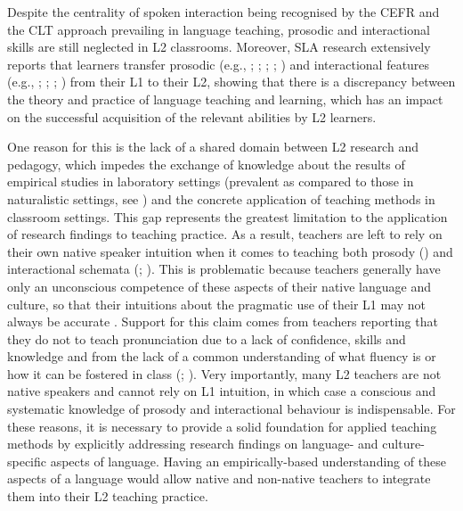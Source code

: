 Despite the centrality of spoken interaction being recognised by the CEFR and the CLT approach prevailing in language teaching, prosodic and interactional skills are still neglected in L2 classrooms. Moreover, SLA research extensively reports that learners transfer prosodic (e.g., \citealt{RasierHiligsmann2007}; \citealt{GoadWhite2019}; \citealt{NavaZubizarreta2008}; \citealt{AustinEtAl2022}; \citealt{ZhangEtAl2023}) and interactional features (e.g., \citealt{Reinhardt2022}; \citealt{SbrannaEtAl2020}; \citealt{Handley2024}; \citealt{ClingwallEtAl2024}) from their L1 to their L2, showing that there is a discrepancy between the theory and practice of language teaching and learning, which has an impact on the successful acquisition of the relevant abilities by L2 learners. 

One reason for this is the lack of a shared domain between L2 research and pedagogy, which impedes the exchange of knowledge about the results of empirical studies in laboratory settings (prevalent as compared to those in naturalistic settings, see \citealt{LoewenSato2018}) and the concrete application of teaching methods in classroom settings. This gap represents the greatest limitation to the application of research findings to teaching practice. As a result, teachers are left to rely on their own native speaker intuition when it comes to teaching both prosody (\citealt{DerwingMunro2015}) and interactional schemata (\citealt{Campbell-Larsen2022}; \citealt{TavakoliHunter2018}). This is problematic because teachers generally have only an unconscious competence of these aspects of their native language and culture, so that their intuitions about the pragmatic use of their L1 may not always be accurate \citep{Cohen2005}. Support for this claim comes from teachers reporting that they do not to teach pronunciation due to a lack of confidence, skills and knowledge \citep{Macdonald2002} and from the lack of a common understanding of what fluency is or how it can be fostered in class (\citealt{Morrison2018}; \citealt{Tavakoli2023}). Very importantly, many L2 teachers are not native speakers and cannot rely on L1 intuition, in which case a conscious and systematic knowledge of prosody and interactional behaviour is indispensable. For these reasons, it is necessary to provide a solid foundation for applied teaching methods by explicitly addressing research findings on language- and culture-specific aspects of language. Having an empirically-based understanding of these aspects of a language would allow native and non-native teachers to integrate them into their L2 teaching practice.

